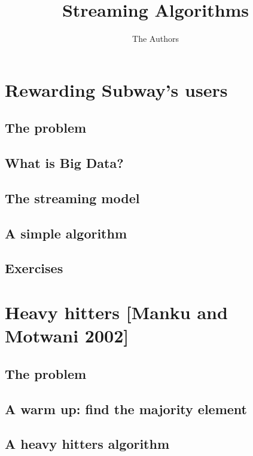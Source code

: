 \documentclass[12pt]{article}
\title{Streaming Algorithms}
\author{The Authors}
\begin{document}
\maketitle


\section{Rewarding Subway's users}

\subsection{The problem}

\subsection{What is Big Data?}

\subsection{The streaming model}

\subsection{A simple algorithm}

\subsection{Exercises}


\section{Heavy hitters {\small [Manku and Motwani 2002]}}


\subsection{The problem}

\subsection{A warm up: find the majority element}


\subsection{A heavy hitters algorithm}
\end{document}
